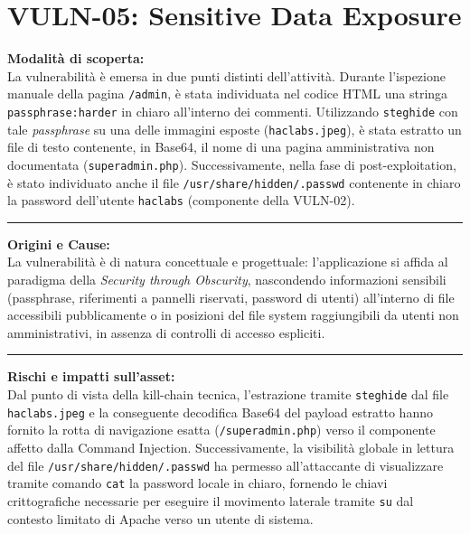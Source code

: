 \documentclass[11pt]{report}
\begin{document}
	\section{VULN-05: Sensitive Data Exposure}
	\begin{tcolorbox}[colback=gray!5, colframe=headerblue, arc=3pt, boxrule=0.8pt, breakable]
		\textbf{Modalità di scoperta:}\\
		La vulnerabilità è emersa in due punti distinti dell'attività. Durante l'ispezione manuale della pagina \texttt{/admin}, è stata individuata nel codice HTML una stringa \texttt{passphrase:harder} in chiaro all'interno dei commenti. Utilizzando \texttt{steghide} con tale \textit{passphrase} su una delle immagini esposte (\texttt{haclabs.jpeg}), è stata estratto un file di testo contenente, in Base64, il nome di una pagina amministrativa non documentata (\texttt{superadmin.php}). Successivamente, nella fase di post-exploitation, è stato individuato anche il file \texttt{/usr/share/hidden/.passwd} contenente in chiaro la password dell'utente \texttt{haclabs} (componente della VULN-02).
		
		\vspace{0.2cm}\hrule\vspace{0.2cm}
		
		\textbf{Origini e Cause:}\\
		La vulnerabilità è di natura concettuale e progettuale: l'applicazione si affida al paradigma della \textit{Security through Obscurity}, nascondendo informazioni sensibili (passphrase, riferimenti a pannelli riservati, password di utenti) all'interno di file accessibili pubblicamente o in posizioni del file system raggiungibili da utenti non amministrativi, in assenza di controlli di accesso espliciti.
		
		\vspace{0.2cm}\hrule\vspace{0.2cm}
		
		\textbf{Rischi e impatti sull'asset:}\\
		Dal punto di vista della kill-chain tecnica, l'estrazione tramite \texttt{steghide} dal file \texttt{haclabs.jpeg} e la conseguente decodifica Base64 del payload estratto hanno fornito la rotta di navigazione esatta (\texttt{/superadmin.php}) verso il componente affetto dalla Command Injection. Successivamente, la visibilità globale in lettura del file \texttt{/usr/share/hidden/.passwd} ha permesso all'attaccante di visualizzare tramite comando \texttt{cat} la password locale in chiaro, fornendo le chiavi crittografiche necessarie per eseguire il movimento laterale tramite \texttt{su} dal contesto limitato di Apache verso un utente di sistema.
		

\end{tcolorbox}
\end{document}

